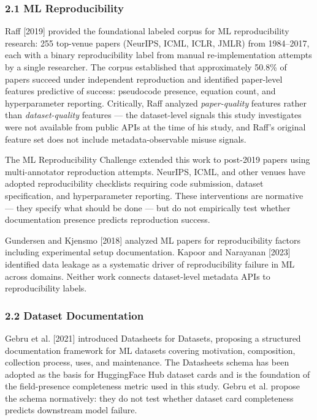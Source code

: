 
\subsubsection{2.1 ML Reproducibility}

Raff [2019] provided the foundational labeled corpus for ML reproducibility research: 255 top-venue papers (NeurIPS, ICML, ICLR, JMLR) from 1984--2017, each with a binary reproducibility label from manual re-implementation attempts by a single researcher. The corpus established that approximately 50.8\% of papers succeed under independent reproduction and identified paper-level features predictive of success: pseudocode presence, equation count, and hyperparameter reporting. Critically, Raff analyzed \textit{paper-quality} features rather than \textit{dataset-quality} features --- the dataset-level signals this study investigates were not available from public APIs at the time of his study, and Raff's original feature set does not include metadata-observable misuse signals.

The ML Reproducibility Challenge \citep{Pineau2021Improving} extended this work to post-2019 papers using multi-annotator reproduction attempts. NeurIPS, ICML, and other venues have adopted reproducibility checklists requiring code submission, dataset specification, and hyperparameter reporting. These interventions are normative --- they specify what should be done --- but do not empirically test whether documentation presence predicts reproduction success.

Gundersen and Kjensmo [2018] analyzed ML papers for reproducibility factors including experimental setup documentation. Kapoor and Narayanan [2023] identified data leakage as a systematic driver of reproducibility failure in ML across domains. Neither work connects dataset-level metadata APIs to reproducibility labels.

\subsubsection{2.2 Dataset Documentation}

Gebru et al. [2021] introduced Datasheets for Datasets, proposing a structured documentation framework for ML datasets covering motivation, composition, collection process, uses, and maintenance. The Datasheets schema has been adopted as the basis for HuggingFace Hub dataset cards and is the foundation of the field-presence completeness metric used in this study. Gebru et al. propose the schema normatively: they do not test whether dataset card completeness predicts downstream model failure.

